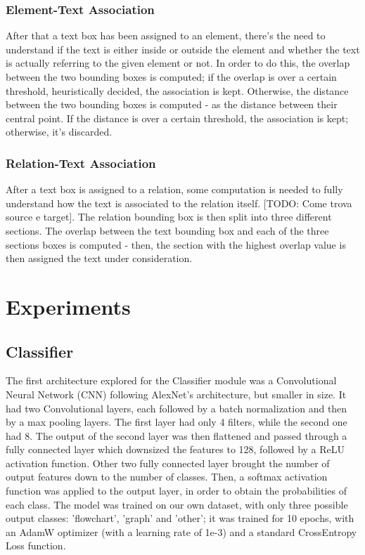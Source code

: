 \documentclass[conference]{IEEEtran}
\begin{document}
\subsubsection{Element-Text Association}
After that a text box has been assigned to an element, there's the need to understand if the text is either inside or outside the element and whether the text is actually referring to the given element or not. In order to do this, the overlap between the two bounding boxes is computed; if the overlap is over a certain threshold, heuristically decided, the association is kept. Otherwise, the distance between the two bounding boxes is computed - as the distance between their central point. If the distance is over a certain threshold, the association is kept; otherwise, it's discarded.\\

\subsubsection{Relation-Text Association}
After a text box is assigned to a relation, some computation is needed to fully understand how the text is associated to the relation itself. [TODO: Come trova source e target]. The relation bounding box is then split into three different sections. The overlap between the text bounding box and each of the three sections boxes is computed - then, the section with the highest overlap value is then assigned the text under consideration.

\section{Experiments}

\subsection{Classifier}
\label{exp:classifier}
The first architecture explored for the Classifier module was a Convolutional Neural Network (CNN) following AlexNet's architecture, but smaller in size.
It had two Convolutional layers, each followed by a batch normalization and then by a max pooling layers. The first layer had only 4 filters, while the second one had 8.
The output of the second layer was then flattened and passed through a fully connected layer which downsized the features to 128, followed by a ReLU activation function. Other two fully connected layer brought the number of output features down to the number of classes.
Then, a softmax activation function was applied to the output layer, in order to obtain the probabilities of each class.
The model was trained on our own dataset, with only three possible output classes: 'flowchart', 'graph' and 'other'; it was trained for 10 epochs, with an AdamW optimizer (with a learning rate of 1e-3) and a standard CrossEntropy Loss function.
\\
\end{document}
